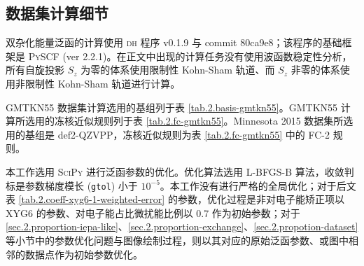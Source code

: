 \subsection{数据集计算细节}

双杂化能量泛函的计算使用 \textsc{dh} 程序 v0.1.9 与 commit 80ca9e8；该程序的基础框架是 \textsc{PySCF} (ver 2.2.1)。在正文中出现的计算任务没有使用波函数稳定性分析，所有自旋投影 $S_z$ 为零的体系使用限制性 Kohn-Sham 轨道、而 $S_z$ 非零的体系使用非限制性 Kohn-Sham 轨道进行计算。

GMTKN55 数据集计算选用的基组列于表 \ref{tab.2.basis-gmtkn55}。GMTKN55 计算所选用的冻核近似规则列于表 \ref{tab.2.fc-gmtkn55}。Minnesota 2015 数据集所选用的基组是 def2-QZVPP，冻核近似规则为表 \ref{tab.2.fc-gmtkn55} 中的 FC-2 规则。

本工作选用 \textsc{SciPy}\cite{Virtanen-Vazquez-Baeza.NM.2020} 进行泛函参数的优化。优化算法选用 L-BFGS-B 算法\cite{Byrd-Zhu.SJSC.1995}，收敛判标是参数梯度模长 (\verb|gtol|) 小于 $10^{-5}$。本工作没有进行严格的全局优化；对于后文表 \ref{tab.2.coeff-xyg6-1-weighted-error} 的参数，优化过程是非对电子能矫正项以 XYG6 的参数、对电子能占比微扰能比例以 0.7 作为初始参数；对于 \ref{sec.2.proportion-iepa-like}、\ref{sec.2.proportion-exchange}、\ref{sec.2.propotion-dataset} 等小节中的参数优化问题与图像绘制过程，则以其对应的原始泛函参数、或图中相邻的数据点作为初始参数优化。

\begin{table}[h]
\centering
\caption[GMTKN55 数据集计算所使用的基组]{GMTKN55 数据集计算所使用的基组}
\label{tab.2.basis-gmtkn55}
\end{table}

